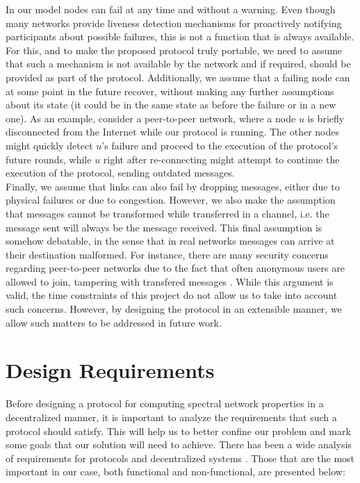 \documentclass[a4paper,11pt,twoside]{report}
\begin{document}
In our model nodes can fail at any time and without a warning. Even though many networks provide liveness detection mechanisms for proactively notifying participants about possible failures, this is not a function that is always available. For this, and to make the proposed protocol truly portable, we need to assume that such a mechanism is not available by the network and if required, should be provided as part of the protocol. Additionally, we assume that a failing node can at some point in the future recover, without making any further assumptions about its state (it could be in the same state as before the failure or in a new one). As an example, consider a peer-to-peer network, where a node $u$ is briefly disconnected from the Internet while our protocol is running. The other nodes might quickly detect $u$'s failure and proceed to the execution of the protocol's future rounds, while $u$ right after re-connecting might attempt to continue the execution of the protocol, sending outdated messages.\\

Finally, we assume that links can also fail by dropping messages, either due to physical failures or due to congestion. However, we also make the assumption that messages cannot be transformed while transferred in a channel, i.e. the message sent will always be the message received. This final assumption is somehow debatable, in the sense that in real networks messages can arrive at their destination malformed. For instance, there are many security concerns regarding peer-to-peer networks due to the fact that often anonymous users are allowed to join, tampering with transfered messages \cite{chien2003malicious}. While this argument is valid, the time constraints of this project do not allow us to take into account such concerns. However, by designing the protocol in an extensible manner, we allow such matters to be addressed in future work.\\


\section{Design Requirements}

Before designing a protocol for computing spectral network properties in a decentralized manner, it is important to analyze the requirements that such a protocol should satisfy. This will help us to better confine our problem and mark some goals that our solution will need to achieve. There has been a wide analysis of requirements for protocols and decentralized systems \cite{Rose01onthe} \cite{Kendall:1994:NDC:974938}. Those that are the most important in our case, both functional and non-functional, are presented below:
\end{document}
